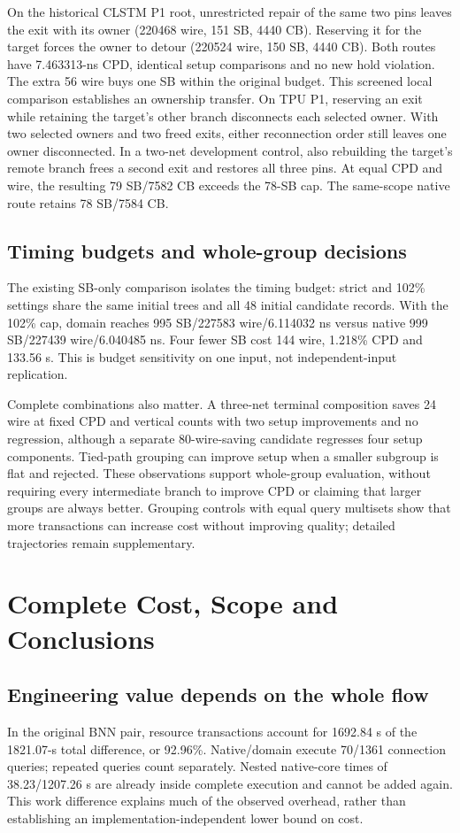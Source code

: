 \documentclass[conference,10pt]{IEEEtran}
\begin{document}
On the historical CLSTM P1 root, unrestricted repair of the same two pins leaves the exit with its owner (220468 wire, 151 SB, 4440 CB). Reserving it for the target forces the owner to detour (220524 wire, 150 SB, 4440 CB). Both routes have 7.463313-ns CPD, identical setup comparisons and no new hold violation. The extra 56 wire buys one SB within the original budget. This screened local comparison establishes an ownership transfer. On TPU P1, reserving an exit while retaining the target's other branch disconnects each selected owner. With two selected owners and two freed exits, either reconnection order still leaves one owner disconnected. In a two-net development control, also rebuilding the target's remote branch frees a second exit and restores all three pins. At equal CPD and wire, the resulting 79 SB/7582 CB exceeds the 78-SB cap. The same-scope native route retains 78 SB/7584 CB.

\subsection{Timing budgets and whole-group decisions}
The existing SB-only comparison isolates the timing budget: strict and 102\% settings share the same initial trees and all 48 initial candidate records. With the 102\% cap, domain reaches 995 SB/227583 wire/6.114032 ns versus native 999 SB/227439 wire/6.040485 ns. Four fewer SB cost 144 wire, 1.218\% CPD and 133.56 s. This is budget sensitivity on one input, not independent-input replication.

Complete combinations also matter. A three-net terminal composition saves 24 wire at fixed CPD and vertical counts with two setup improvements and no regression, although a separate 80-wire-saving candidate regresses four setup components. Tied-path grouping can improve setup when a smaller subgroup is flat and rejected. These observations support whole-group evaluation, without requiring every intermediate branch to improve CPD or claiming that larger groups are always better. Grouping controls with equal query multisets show that more transactions can increase cost without improving quality; detailed trajectories remain supplementary.

\section{Complete Cost, Scope and Conclusions}
\subsection{Engineering value depends on the whole flow}
In the original BNN pair, resource transactions account for 1692.84 s of the 1821.07-s total difference, or 92.96\%. Native/domain execute 70/1361 connection queries; repeated queries count separately. Nested native-core times of 38.23/1207.26 s are already inside complete execution and cannot be added again. This work difference explains much of the observed overhead, rather than establishing an implementation-independent lower bound on cost.
\end{document}
